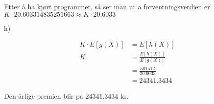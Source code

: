 \documentclass[12pt, a4paper]{article}
\begin{document}
Etter å ha kjørt programmet, så ser man ut a forventningsverdien er $K \cdot 20.603314835251663 \approx K \cdot 20.6033$

\newpage

h)

\begin{equation}
    \begin{split}
        K \cdot E[g(X)] &= E[h(X)] \\
                      K &= \frac{E[h(X)]}{E[g(X)]} \\
                        &= \frac{501512}{20.6033} \\
                        &= 24341.3434
    \end{split}
\end{equation}

Den årlige premien blir på $24341.3434$ kr.
\end{document}

